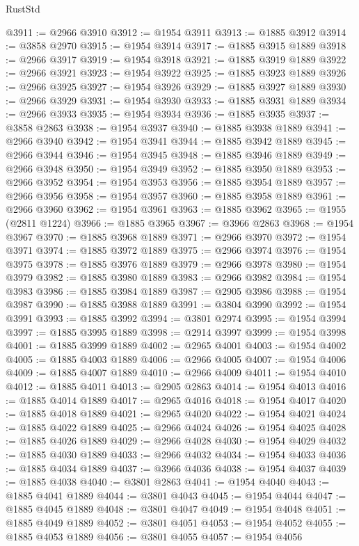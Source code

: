 \begin{lexlean}{RustStd}
\begin{coremodule}
{\begin{coremodule}
{{{{{{{{{{{{{{{{{{{{{{{{{{{{{@3911 := @2966 @3910
@3912 := @1954 @3911
@3913 := @1885 @3912
@3914 := @3858 @2970
@3915 := @1954 @3914
@3917 := @1885 @3915 @1889
@3918 := @2966 @3917
@3919 := @1954 @3918
@3921 := @1885 @3919 @1889
@3922 := @2966 @3921
@3923 := @1954 @3922
@3925 := @1885 @3923 @1889
@3926 := @2966 @3925
@3927 := @1954 @3926
@3929 := @1885 @3927 @1889
@3930 := @2966 @3929
@3931 := @1954 @3930
@3933 := @1885 @3931 @1889
@3934 := @2966 @3933
@3935 := @1954 @3934
@3936 := @1885 @3935
@3937 := @3858 @2863
@3938 := @1954 @3937
@3940 := @1885 @3938 @1889
@3941 := @2966 @3940
@3942 := @1954 @3941
@3944 := @1885 @3942 @1889
@3945 := @2966 @3944
@3946 := @1954 @3945
@3948 := @1885 @3946 @1889
@3949 := @2966 @3948
@3950 := @1954 @3949
@3952 := @1885 @3950 @1889
@3953 := @2966 @3952
@3954 := @1954 @3953
@3956 := @1885 @3954 @1889
@3957 := @2966 @3956
@3958 := @1954 @3957
@3960 := @1885 @3958 @1889
@3961 := @2966 @3960
@3962 := @1954 @3961
@3963 := @1885 @3962
@3965 := @1955 (@2811 @1224)
@3966 := @1885 @3965
@3967 := @3966 @2863
@3968 := @1954 @3967
@3970 := @1885 @3968 @1889
@3971 := @2966 @3970
@3972 := @1954 @3971
@3974 := @1885 @3972 @1889
@3975 := @2966 @3974
@3976 := @1954 @3975
@3978 := @1885 @3976 @1889
@3979 := @2966 @3978
@3980 := @1954 @3979
@3982 := @1885 @3980 @1889
@3983 := @2966 @3982
@3984 := @1954 @3983
@3986 := @1885 @3984 @1889
@3987 := @2905 @3986
@3988 := @1954 @3987
@3990 := @1885 @3988 @1889
@3991 := @3804 @3990
@3992 := @1954 @3991
@3993 := @1885 @3992
@3994 := @3801 @2974
@3995 := @1954 @3994
@3997 := @1885 @3995 @1889
@3998 := @2914 @3997
@3999 := @1954 @3998
@4001 := @1885 @3999 @1889
@4002 := @2965 @4001
@4003 := @1954 @4002
@4005 := @1885 @4003 @1889
@4006 := @2966 @4005
@4007 := @1954 @4006
@4009 := @1885 @4007 @1889
@4010 := @2966 @4009
@4011 := @1954 @4010
@4012 := @1885 @4011
@4013 := @2905 @2863
@4014 := @1954 @4013
@4016 := @1885 @4014 @1889
@4017 := @2965 @4016
@4018 := @1954 @4017
@4020 := @1885 @4018 @1889
@4021 := @2965 @4020
@4022 := @1954 @4021
@4024 := @1885 @4022 @1889
@4025 := @2966 @4024
@4026 := @1954 @4025
@4028 := @1885 @4026 @1889
@4029 := @2966 @4028
@4030 := @1954 @4029
@4032 := @1885 @4030 @1889
@4033 := @2966 @4032
@4034 := @1954 @4033
@4036 := @1885 @4034 @1889
@4037 := @3966 @4036
@4038 := @1954 @4037
@4039 := @1885 @4038
@4040 := @3801 @2863
@4041 := @1954 @4040
@4043 := @1885 @4041 @1889
@4044 := @3801 @4043
@4045 := @1954 @4044
@4047 := @1885 @4045 @1889
@4048 := @3801 @4047
@4049 := @1954 @4048
@4051 := @1885 @4049 @1889
@4052 := @3801 @4051
@4053 := @1954 @4052
@4055 := @1885 @4053 @1889
@4056 := @3801 @4055
@4057 := @1954 @4056
}}}}}}}}}}}}}}}}}}}}}}}}}}}}}
\end{coremodule}}
\end{coremodule}
\end{lexlean}

